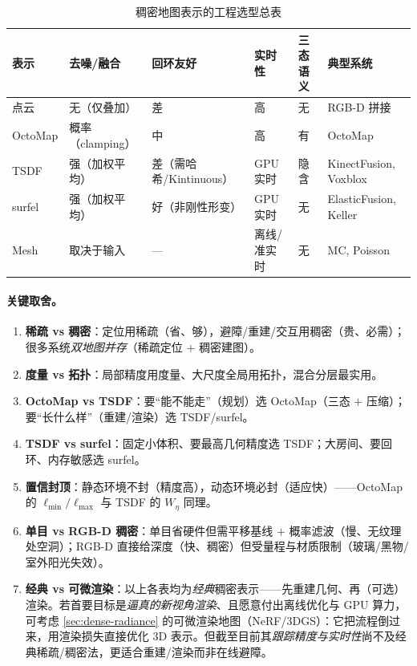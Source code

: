 \begin{table}[H]\centering\small
\caption{稠密地图表示的工程选型总表}
\label{tab:dense-engineering}
\begin{tabular}{p{} p{} p{} p{} p{} p{}}
\toprule
表示 & 去噪/融合 & 回环友好 & 实时性 & 三态语义 & 典型系统 \\
\midrule
点云 & 无（仅叠加） & 差 & 高 & 无 & RGB-D 拼接 \\
OctoMap & 概率（clamping） & 中 & 高 & 有 & OctoMap \\
TSDF & 强（加权平均） & 差（需哈希/Kintinuous） & GPU 实时 & 隐含 & KinectFusion, Voxblox \\
surfel & 强（加权平均） & 好（非刚性形变） & GPU 实时 & 无 & ElasticFusion, Keller \\
Mesh & 取决于输入 & --- & 离线/准实时 & 无 & MC, Poisson \\
\bottomrule
\end{tabular}
\end{table}

\paragraph{关键取舍。}
\begin{enumerate}
  \item \textbf{稀疏 vs 稠密}：定位用稀疏（省、够），避障/重建/交互用稠密（贵、必需）；很多系统\emph{双地图并存}（稀疏定位 $+$ 稠密建图）。
  \item \textbf{度量 vs 拓扑}：局部精度用度量、大尺度全局用拓扑，混合分层最实用。
  \item \textbf{OctoMap vs TSDF}：要“能不能走”（规划）选 OctoMap（三态 $+$ 压缩）；要“长什么样”（重建/渲染）选 TSDF/surfel。
  \item \textbf{TSDF vs surfel}：固定小体积、要最高几何精度选 TSDF；大房间、要回环、内存敏感选 surfel。
  \item \textbf{置信封顶}：静态环境不封（精度高），动态环境必封（适应快）——OctoMap 的 $\ell_{\min}/\ell_{\max}$ 与 TSDF 的 $W_\eta$ 同理。
  \item \textbf{单目 vs RGB-D 稠密}：单目省硬件但需平移基线 $+$ 概率滤波（慢、无纹理处空洞）；RGB-D 直接给深度（快、稠密）但受量程与材质限制（玻璃/黑物/室外阳光失效）。
  \item \textbf{经典 vs 可微渲染}：以上各表均为\emph{经典}稠密表示——先重建几何、再（可选）渲染。若首要目标是\emph{逼真的新视角渲染}、且愿意付出离线优化与 GPU 算力，可考虑 \cref{sec:dense-radiance} 的可微渲染地图（NeRF/3DGS）：它把流程倒过来，用渲染损失直接优化 3D 表示。但截至目前其\emph{跟踪精度与实时性}尚不及经典稀疏/稠密法，更适合重建/渲染而非在线避障。
\end{enumerate}

